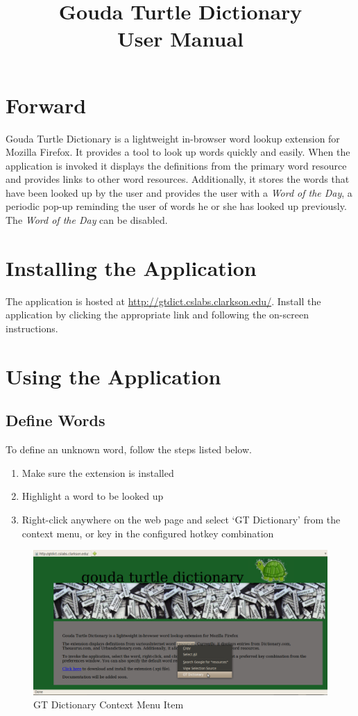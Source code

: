\documentclass[11pt]{article}
\title{{Gouda Turtle Dictionary} \\ User Manual}
\date{}
\begin{document}
\maketitle

\section{Forward}
Gouda Turtle Dictionary is a lightweight in-browser word lookup extension for
Mozilla Firefox. It provides a tool to look up words quickly and easily.
When the application is invoked
it displays the definitions from the primary word resource
and provides links to other word resources.
Additionally, it stores the words that have been looked up by the user and
provides the user with a \textit{Word of the Day}, a periodic pop-up
reminding the user of words he or she has looked up previously.
The \textit{Word of the Day}
can be disabled.

\section{Installing the Application}
The application is hosted at
\href{http://gtdict.cslabs.clarkson.edu/}{http://gtdict.cslabs.clarkson.edu/}.
Install the application by clicking the appropriate link and following the
on-screen instructions.

\section{Using the Application}
\subsection{Define Words}
To define an unknown word, follow the steps listed below.

\begin{enumerate}
\item{Make sure the extension is installed}
\item{Highlight a word to be looked up}
\item{Right-click anywhere on the web page and select `GT Dictionary' from the
context menu, or key in the configured hotkey combination}
\end{enumerate}

\begin{figure}[ht!]
\centering
\includegraphics[scale=0.30]{gt0.png}
\caption{GT Dictionary Context Menu Item}
\label{right}
\end{figure}
\end{document}
